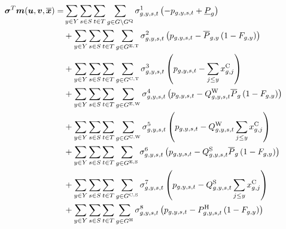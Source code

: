 \documentclass{article}
\begin{document}
\begin{align}
		\bm{\sigma}^{T}\bm{m}(\bm{u}, \bm{v}, \bm{\overline{x}}) = & \sum\limits_{\iYear \in \sYears}\sum\limits_{\iScenario \in \sScenarios}\sum\limits_{\iInterval \in \sIntervals} \sum\limits_{\iGenerator \in \sGenerators \setminus \sStorage} \dMinPowerOutput \left(-\vPower + \cPowerOutputMin\right)\\
		& + \sum\limits_{\iYear \in \sYears}\sum\limits_{\iScenario \in \sScenarios}\sum\limits_{\iInterval \in \sIntervals} \sum\limits_{\iGenerator \in \sGeneratorsExistingThermal} \dMaxPowerOutputExistingThermal \left(\vPower - \cPowerOutputMax \left(1 - \cRetirementIndicator\right)\right)\\
		& + \sum\limits_{\iYear \in \sYears}\sum\limits_{\iScenario \in \sScenarios}\sum\limits_{\iInterval \in \sIntervals} \sum\limits_{\iGenerator \in \sGeneratorsCandidateThermal} \dMaxPowerOutputCandidateThermal \left(\vPower - \sum\limits_{\iYearAlias \leq \iYear} \vInstalledCapacity[\iGenerator,\iYearAlias]\right)\\
		& + \sum\limits_{\iYear \in \sYears}\sum\limits_{\iScenario \in \sScenarios}\sum\limits_{\iInterval \in \sIntervals} \sum\limits_{\iGenerator \in \sGeneratorsExistingWind} \dMaxPowerOutputWindExisting \left(\vPower - \cCapacityFactorWind \cPowerOutputMax[\iGenerator] \left(1 - \cRetirementIndicator\right) \right)\\
		& + \sum\limits_{\iYear \in \sYears}\sum\limits_{\iScenario \in \sScenarios}\sum\limits_{\iInterval \in \sIntervals} \sum\limits_{\iGenerator \in \sGeneratorsCandidateWind} \dMaxPowerOutputWindCandidate \left(\vPower - \cCapacityFactorWind \sum\limits_{\iYearAlias \leq \iYear} \vInstalledCapacity[\iGenerator,\iYearAlias]\right)\\
		& + \sum\limits_{\iYear \in \sYears}\sum\limits_{\iScenario \in \sScenarios}\sum\limits_{\iInterval \in \sIntervals} \sum\limits_{\iGenerator \in \sGeneratorsExistingSolar} \dMaxPowerOutputSolarExisting \left(\vPower - \cCapacityFactorSolar \cPowerOutputMax[\iGenerator] \left(1 - \cRetirementIndicator\right)\right)\\
		& + \sum\limits_{\iYear \in \sYears}\sum\limits_{\iScenario \in \sScenarios}\sum\limits_{\iInterval \in \sIntervals} \sum\limits_{\iGenerator \in \sGeneratorsCandidateSolar} \dMaxPowerOutputSolarCandidate \left(\vPower - \cCapacityFactorSolar \sum\limits_{\iYearAlias \leq \iYear} \vInstalledCapacity[\iGenerator,\iYearAlias]\right)\\
		& + \sum\limits_{\iYear \in \sYears}\sum\limits_{\iScenario \in \sScenarios}\sum\limits_{\iInterval \in \sIntervals} \sum\limits_{\iGenerator \in \sGeneratorsHydro} \dMaxPowerOutputHydro \left(\vPower - \cPowerOutputHydro \left(1 - \cRetirementIndicator\right) \right)\\

\end{align}
\end{document}
